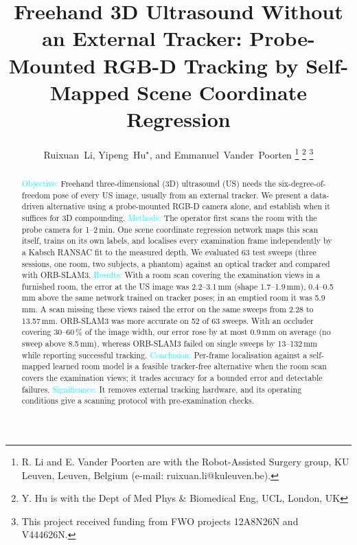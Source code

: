 \documentclass[9pt,shortpaper,twoside,web]{ieeecolor2}
\begin{document}
\title{Freehand 3D Ultrasound Without an External Tracker: Probe-Mounted RGB-D Tracking by Self-Mapped Scene Coordinate Regression}

\author{Ruixuan~Li, Yipeng~Hu$^\star$, and Emmanuel~Vander~Poorten%
\thanks{R. Li and E. Vander Poorten are with the Robot-Assisted Surgery group, KU Leuven, Leuven, Belgium (e-mail: ruixuan.li@kuleuven.be).}%
\thanks{Y. Hu is with the Dept of Med Phys \& Biomedical Eng, UCL, London, UK}
\thanks{This project received funding from FWO projects 12A8N26N and V444626N.}}

\maketitle

\begin{abstract}
\textcolor{cyan}{Objective:} Freehand three-dimensional (3D) ultrasound (US) needs the six-degree-of-freedom pose of every US image, usually from an external tracker. We present a data-driven alternative using a probe-mounted RGB-D camera alone, and establish when it suffices for 3D compounding. \textcolor{cyan}{Methods:} The operator first scans the room with the probe camera for 1--2\,min. One scene coordinate regression network maps this scan itself, trains on its own labels, and localises every examination frame independently by a Kabsch RANSAC fit to the measured depth. We evaluated 63 test sweeps (three sessions, one room, two subjects, a phantom) against an optical tracker and compared with ORB-SLAM3. \textcolor{cyan}{Results:} With a room scan covering the examination views in a furnished room, the error at the US image was 2.2--3.1\,mm (shape 1.7--1.9\,mm), 0.4--0.5\,mm above the same network trained on tracker poses; in an emptied room it was 5.9\,mm. A scan missing these views raised the error on the same sweeps from 2.28 to 13.57\,mm. ORB-SLAM3 was more accurate on 52 of 63 sweeps. With an occluder covering 30--60\,\% of the image width, our error rose by at most 0.9\,mm on average (no sweep above 8.5\,mm), whereas ORB-SLAM3 failed on single sweeps by 13--132\,mm while reporting successful tracking. \textcolor{cyan}{Conclusion:} Per-frame localisation against a self-mapped learned room model is a feasible tracker-free alternative when the room scan covers the examination views; it trades accuracy for a bounded error and detectable failures. \textcolor{cyan}{Significance:} It removes external tracking hardware, and its operating conditions give a scanning protocol with pre-examination checks.
\end{abstract}
\end{document}
